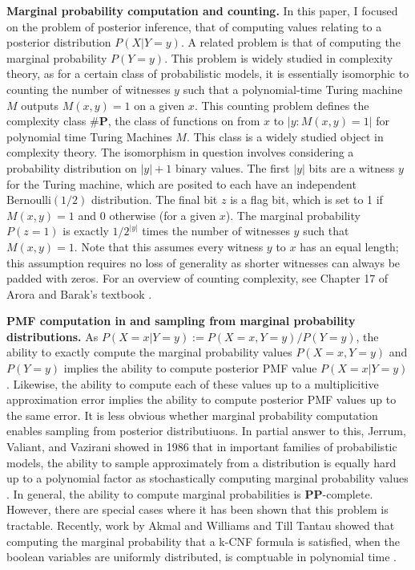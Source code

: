 \documentclass{article}
\renewcommand{\P}{\mathbf{P}}
\def \PP{\P\P}
\theoremstyle{definition}
\theoremstyle{remark}
\begin{document}
\textbf{Marginal probability computation and counting.}
In this paper, I focused on the problem of posterior inference, that of computing values relating to a posterior distribution $P(X | Y = y)$.
A related problem is that of computing the marginal probability $P(Y = y)$.
This problem is widely studied in complexity theory, as for a certain class of probabilistic models, it is essentially isomorphic to counting the number of witnesses $y$ such that a polynomial-time Turing machine $M$ outputs $M(x, y) = 1$ on a given $x$.
This counting problem defines the complexity class $\#\P$, the class of functions on from $x$ to $|y : M(x, y) = 1|$ for polynomial time Turing Machines $M$. This class is a widely studied object in complexity theory.
The isomorphism in question involves considering a probability distribution on $|y| + 1$ binary values.
The first $|y|$ bits are a witness $y$ for the Turing machine, which are posited to each have an independent $\text{Bernoulli}(1/2)$ distribution.
The final bit $z$ is a flag bit, which is set to 1 if $M(x, y) = 1$ and 0 otherwise (for a given $x$).
The marginal probability $P(z = 1)$ is exactly $1/2^{|y|}$ times the number of witnesses $y$ such that $M(x, y) = 1$.
Note that this assumes every witness $y$ to $x$ has an equal length; this assumption requires no loss of generality as shorter witnesses can always be padded with zeros.
For an overview of counting complexity, see Chapter 17 of Arora and Barak's textbook \cite{arora2009computational}.

\textbf{PMF computation in and sampling from marginal probability distributions.}
As $P(X = x | Y = y) := P(X = x, Y = y) / P(Y = y)$, the ability to exactly compute the marginal probability values $P(X = x, Y = y)$ and $P(Y = y)$ implies the ability to compute posterior PMF value $P(X = x | Y = y)$.
Likewise, the ability to compute each of these values up to a multiplicitive approximation error implies the ability to compute posterior PMF values up to the same error.
It is less obvious whether marginal probability computation enables sampling from posterior distributiuons.
In partial answer to this, Jerrum, Valiant, and Vazirani showed in 1986 that in important families of probabilistic models, the ability to sample approximately from a distribution is equally hard up to a polynomial factor as stochastically computing marginal probability values \cite{jerrum1986}.
In general, the ability to compute marginal probabilities is $\PP$-complete.
However, there are special cases where it has been shown that this problem is tractable.
Recently, work by Akmal and Williams and Till Tantau showed that computing the marginal probability that a k-CNF formula is satisfied, when the boolean variables are uniformly distributed, is comptuable in polynomial time \cite{akmal2022majority,tantau2022satisfaction}.
\end{document}
